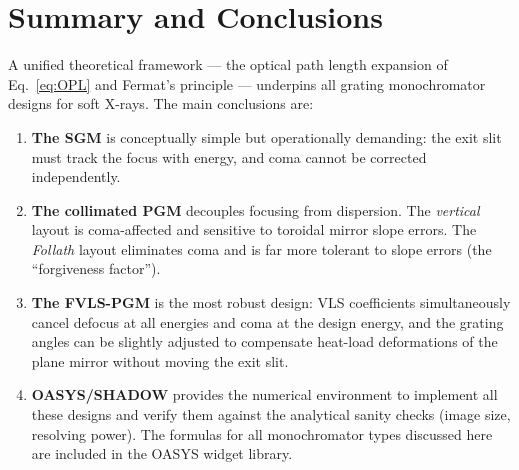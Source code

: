 \documentclass[12pt,a4paper]{article}
\newcommand{\placeholder}[4][\linewidth]{%
  \begin{figure}[H]
    \centering
    \begin{tikzpicture}
      \draw[fill=plbg, draw=plframe, line width=1pt, dashed]
            (0,0) rectangle (#1, #2);
      \draw[plframe, line width=0.4pt] (0,0) -- (#1,#2);
      \draw[plframe, line width=0.4pt] (#1,0) -- (0,#2);
      \node[anchor=north west, font=\small\bfseries\color{plframe},
            inner sep=4pt] at (0,#2) {#3};
      \node[anchor=center, font=\small\itshape\color{pltext},
            text width=0.75\linewidth, align=center]
            at ({0.5*#1},{0.5*#2}) {#4};
    \end{tikzpicture}
  \end{figure}
}
\newcommand{\RP}{\mathrm{RP}}
\begin{document}
\section{Summary and Conclusions}
A unified theoretical framework --- the optical path
length expansion of Eq.~\eqref{eq:OPL} and Fermat's principle --- underpins all
grating monochromator designs for soft X-rays.  The main conclusions are:

\begin{enumerate}[leftmargin=*, label=\arabic*.]
  \item \textbf{The SGM} is conceptually simple but operationally demanding: the exit slit
        must track the focus with energy, and coma cannot be corrected independently.

  \item \textbf{The collimated PGM} decouples focusing from dispersion.  The
        \emph{vertical} layout is coma-affected and sensitive to toroidal mirror slope
        errors.  The \emph{Follath} layout eliminates coma and is far more
        tolerant to slope errors (the ``forgiveness factor'').

  \item \textbf{The FVLS-PGM} is the most robust design: VLS coefficients simultaneously
        cancel defocus at all energies and coma at the design energy, and the grating
        angles can be slightly adjusted to compensate heat-load deformations of the plane
        mirror without moving the exit slit.

  \item \textbf{OASYS/SHADOW} provides the numerical environment to implement all these
        designs and verify them against the analytical sanity checks (image size,
        resolving power).  The formulas for all monochromator types discussed here are
        included in the OASYS widget library.
\end{enumerate}





\newpage
\appendix
\end{document}
